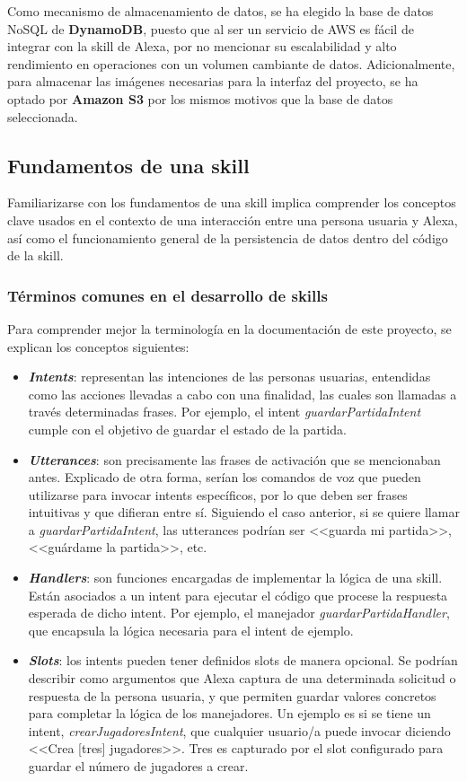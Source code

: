 Como mecanismo de almacenamiento de datos, se ha elegido la base de datos NoSQL de \textbf{DynamoDB}, puesto que al ser un servicio de AWS es fácil de integrar con la skill de Alexa, por no mencionar su escalabilidad y alto rendimiento en operaciones con un volumen cambiante de datos. Adicionalmente, para almacenar las imágenes necesarias para la interfaz del proyecto, se ha optado por \textbf{Amazon S3} por los mismos motivos que la base de datos seleccionada.

\subsection{Fundamentos de una skill}

Familiarizarse con los fundamentos de una skill implica comprender los conceptos clave usados en el contexto de una interacción entre una persona usuaria y Alexa, así como el funcionamiento general de la persistencia de datos dentro del código de la skill.

\subsubsection{Términos comunes en el desarrollo de skills}

Para comprender mejor la terminología en la documentación de este proyecto, se explican los conceptos siguientes:

\begin{itemize}
	\item \textit{\textbf{Intents}}: representan las intenciones de las personas usuarias, entendidas como las acciones llevadas a cabo con una finalidad, las cuales son llamadas a través determinadas frases. Por ejemplo, el intent \textit{guardarPartidaIntent} cumple con el objetivo de guardar el estado de la partida.
	\item \textit{\textbf{Utterances}}: son precisamente las frases de activación que se mencionaban antes. Explicado de otra forma, serían los comandos de voz que pueden utilizarse para invocar intents específicos, por lo que deben ser frases intuitivas y que difieran entre sí. Siguiendo el caso anterior, si se quiere llamar a \textit{guardarPartidaIntent}, las utterances podrían ser <<guarda mi partida>>, <<guárdame la partida>>, etc.
	\item \textit{\textbf{Handlers}}: son funciones encargadas de implementar la lógica de una skill. Están asociados a un intent para ejecutar el código que procese la respuesta esperada de dicho intent. Por ejemplo, el manejador \textit{guardarPartidaHandler}, que encapsula la lógica necesaria para el intent de ejemplo.
	\item \textit{\textbf{Slots}}: los intents pueden tener definidos slots de manera opcional. Se podrían describir como argumentos que Alexa captura de una determinada solicitud o respuesta de la persona usuaria, y que permiten guardar valores concretos para completar la lógica de los manejadores. Un ejemplo es si se tiene un intent, \textit{crearJugadoresIntent}, que cualquier usuario/a puede invocar diciendo <<Crea [tres] jugadores>>. Tres es capturado por el slot configurado para guardar el número de jugadores a crear.
\end{itemize}

